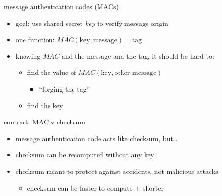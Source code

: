 \begin{frame}{message authentication codes (MACs)}
    \begin{itemize}
    \item goal: use shared secret \textit{key} to verify message origin
    \vspace{.5cm}
    \item one function: $MAC(\text{key}, \text{message}) = \text{tag}$
    \item knowing $MAC$ and the message and the tag, it should be hard to:
        \begin{itemize}
        \item find the value of $MAC(\text{key}, \text{other message})$
            \begin{itemize}
            \item ``forging the tag''
            \end{itemize}
        \item find the key
        \end{itemize}
    \end{itemize}
\end{frame}

\begin{frame}{contrast: MAC v checksum}
    \begin{itemize}
    \item message authentication code acts like checksum, but\ldots
    \vspace{.5cm}
    \item checksum can be recomputed without any key
    \item checksum meant to protect against accidents, not malicious attacks
        \begin{itemize}
        \item checksum can be faster to compute + shorter
        \end{itemize}
    \end{itemize}
\end{frame}

